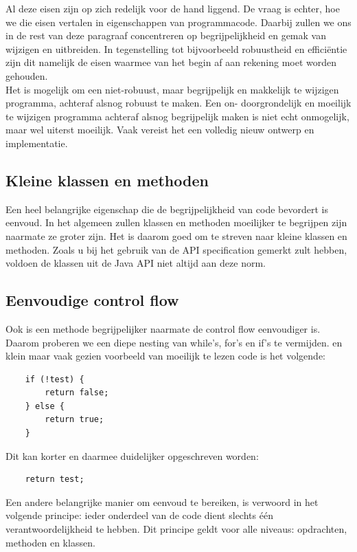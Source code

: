 \documentclass{article}
\begin{document}
	Al deze eisen zijn op zich redelijk voor de hand liggend. De vraag is
	echter, hoe we die eisen vertalen in eigenschappen van programmacode.
	Daarbij zullen we ons in de rest van deze paragraaf concentreren op
	begrijpelijkheid en gemak van wijzigen en uitbreiden. In tegenstelling
	tot bijvoorbeeld robuustheid en efficiëntie zijn dit namelijk de eisen
	waarmee van het begin af aan rekening moet worden gehouden. \\
	Het is mogelijk om een niet-robuust, maar begrijpelijk en makkelijk
	te wijzigen programma, achteraf alsnog robuust te maken. Een on-
	doorgrondelijk en moeilijk te wijzigen programma achteraf alsnog
	begrijpelijk maken is niet echt onmogelijk, maar wel uiterst moeilijk.
	Vaak vereist het een volledig nieuw ontwerp en implementatie. \\
	
	\subsection{Kleine klassen en methoden}
	Een heel belangrijke eigenschap die de begrijpelijkheid van code bevordert is eenvoud. In het algemeen zullen klassen en methoden moeilijker te
	begrijpen zijn naarmate ze groter zijn. Het is daarom goed om te streven
	naar kleine klassen en methoden. Zoals u bij het gebruik van de API specification gemerkt zult hebben, voldoen de klassen uit de Java API niet altijd
	aan deze norm. 
	\subsection{Eenvoudige control flow}
	Ook is een methode begrijpelijker naarmate de control flow eenvoudiger is. Daarom proberen we een diepe nesting van while’s, for’s en if’s te vermijden. en klein maar vaak gezien voorbeeld van moeilijk te lezen code is het volgende: \\
	
	\begin{verbatim}
	if (!test) {
		return false;
	} else {
		return true;
	}
	\end{verbatim}
	Dit kan korter en daarmee duidelijker opgeschreven worden:

	\begin{verbatim}
	return test;
	\end{verbatim}
	
	Een andere belangrijke manier om eenvoud te bereiken, is verwoord
	in het volgende principe: ieder onderdeel van de code dient slechts één
	verantwoordelijkheid te hebben. Dit principe geldt voor alle niveaus:
	opdrachten, methoden en klassen. \\
	
\end{document}
